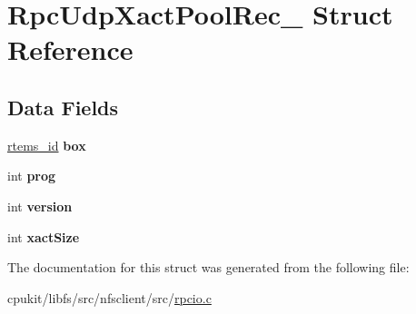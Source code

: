 \hypertarget{structRpcUdpXactPoolRec__}{}\section{Rpc\+Udp\+Xact\+Pool\+Rec\+\_\+ Struct Reference}
\label{structRpcUdpXactPoolRec__}
\subsection*{Data Fields}
\begin{DoxyCompactItemize}
\item 
\mbox{\label{structRpcUdpXactPoolRec___a94c6a70c3a081ae1fa164e2b817aa3b7}} 
\mbox{\hyperlink{group__ClassicTasks_gab20892b814dced7dd4e5b9bf42becd57}{rtems\+\_\+id}} {\bfseries box}
\item 
\mbox{\label{structRpcUdpXactPoolRec___a2ff7dae5b3420dc5911ab7f33623e97c}} 
int {\bfseries prog}
\item 
\mbox{\label{structRpcUdpXactPoolRec___acfe0ae894496c9cade91d6ea4b875950}} 
int {\bfseries version}
\item 
\mbox{\label{structRpcUdpXactPoolRec___a2991f82d8657e9c368c543543180e576}} 
int {\bfseries xact\+Size}
\end{DoxyCompactItemize}


The documentation for this struct was generated from the following file\+:\begin{DoxyCompactItemize}
\item 
cpukit/libfs/src/nfsclient/src/\mbox{\hyperlink{rpcio_8c}{rpcio.\+c}}\end{DoxyCompactItemize}
